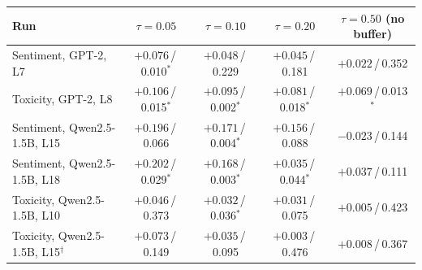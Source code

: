 \begin{tabular}{@{}l cccc@{}}
\toprule
Run & $\tau=0.05$ & $\tau=0.10$ & $\tau=0.20$ & $\tau=0.50$ (no buffer) \\
\midrule
Sentiment, GPT-2, L7 & $+0.076$\,/\,0.010$^{*}$ & $+0.048$\,/\,0.229 & $+0.045$\,/\,0.181 & $+0.022$\,/\,0.352 \\
Toxicity, GPT-2, L8 & $+0.106$\,/\,0.015$^{*}$ & $+0.095$\,/\,0.002$^{*}$ & $+0.081$\,/\,0.018$^{*}$ & $+0.069$\,/\,0.013$^{*}$ \\
Sentiment, Qwen2.5-1.5B, L15 & $+0.196$\,/\,0.066 & $+0.171$\,/\,0.004$^{*}$ & $+0.156$\,/\,0.088 & $-0.023$\,/\,0.144 \\
Sentiment, Qwen2.5-1.5B, L18 & $+0.202$\,/\,0.029$^{*}$ & $+0.168$\,/\,0.003$^{*}$ & $+0.035$\,/\,0.044$^{*}$ & $+0.037$\,/\,0.111 \\
Toxicity, Qwen2.5-1.5B, L10 & $+0.046$\,/\,0.373 & $+0.032$\,/\,0.036$^{*}$ & $+0.031$\,/\,0.075 & $+0.005$\,/\,0.423 \\
\midrule
Toxicity, Qwen2.5-1.5B, L15$^{\dagger}$ & $+0.073$\,/\,0.149 & $+0.035$\,/\,0.095 & $+0.003$\,/\,0.476 & $+0.008$\,/\,0.367 \\
\bottomrule
\end{tabular}